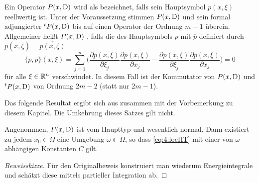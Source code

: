 Ein Operator $P(x,\mathrm D)$ wird als   bezeichnet, falls sein Hauptsymbol $p(x,\xi)$ reellwertig ist. Unter der Voraussetzung stimmen $P(x,\mathrm D)$ und sein formal adjungierter ${}^tP(x,\mathrm D)$ bis auf einen Operator der Ordnung $m-1$ überein. Allgemeiner heißt $P(x,\mathrm D)$ , falls die   des Hauptsymbols $p$ mit $\overline p$ definiert durch $\overline p(x, \overline\zeta) = \overline{p(x,\zeta)}$
\begin{equation}
    \{ p,\overline p\} (x,\xi) = \sum_{j=1}^n \bigg(\frac{\partial p(x,\xi)}{\partial \xi_j} \frac{\partial \overline p (x,\xi)}{\partial x_j} - \frac{\partial \overline p(x,\xi)}{\partial \xi_j}\frac{\partial  p(x,\xi)}{\partial x_j} \bigg)    = 0 
\end{equation}
für alle $\xi\in\mathbb R^n$ verschwindet. In diesem Fall ist der Kommutator von $P(x,\mathrm D)$ und ${}^tP(x,\mathrm D)$ von Ordnung $2m-2$ (statt nur $2m-1$).

Das folgende Resultat ergibt sich aus \cite[Theorem~4.1]{Hormander:1955} zusammen mit der Vorbemerkung zu diesem Kapitel. Die Umkehrung dieses Satzes gilt nicht.

\begin{thm}
Angenommen, $P(x,\mathrm D)$ ist vom Haupttyp und wesentlich normal. Dann existiert zu jedem $x_0\in\Omega$ eine Umgebung $\omega\Subset\Omega$, so dass
\eqref{eq:4:locHT} mit einer von $\omega$ abhängigen Konstanten $C$ gilt.
\end{thm}
\begin{proof}[Beweisskizze]
Für den Originalbeweis konstruiert man wiederum Energieintegrale und schätzt diese mittels partieller Integration ab.
\end{proof}

